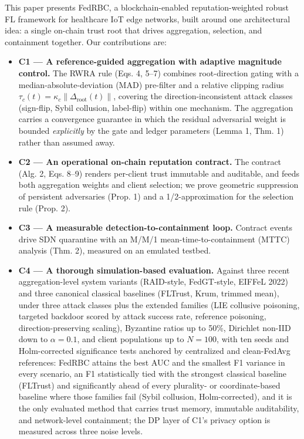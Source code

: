 \documentclass[cmc,article,submit,moreauthors,pdftex]{Definitions/tsp}
\begin{document}
This paper presents FedRBC, a blockchain-enabled reputation-weighted robust FL framework for healthcare IoT edge networks, built around one architectural idea: a single on-chain trust root that drives aggregation, selection, and containment together. Our contributions are:

\begin{itemize}
\item \textbf{C1 --- A reference-guided aggregation with adaptive magnitude control.} The RWRA rule (Eqs. 4, 5--7) combines root-direction gating with a median-absolute-deviation (MAD) pre-filter and a relative clipping radius $\tau_c(t) = \kappa_c\|\Delta_{\mathrm{root}}(t)\|$, covering the direction-inconsistent attack classes (sign-flip, Sybil collusion, label-flip) within one mechanism. The aggregation carries a convergence guarantee in which the residual adversarial weight is bounded \emph{explicitly} by the gate and ledger parameters (Lemma 1, Thm. 1) rather than assumed away.
\item \textbf{C2 --- An operational on-chain reputation contract.} The contract (Alg. 2, Eqs. 8--9) renders per-client trust immutable and auditable, and feeds both aggregation weights and client selection; we prove geometric suppression of persistent adversaries (Prop. 1) and a 1/2-approximation for the selection rule (Prop. 2).
\item \textbf{C3 --- A measurable detection-to-containment loop.} Contract events drive SDN quarantine with an M/M/1 mean-time-to-containment (MTTC) analysis (Thm. 2), measured on an emulated testbed.
\item \textbf{C4 --- A thorough simulation-based evaluation.} Against three recent aggregation-level system variants (RAID-style, FedGT-style, EIFFeL 2022) and three canonical classical baselines (FLTrust, Krum, trimmed mean), under three attack classes plus the extended families (LIE collusive poisoning, targeted backdoor scored by attack success rate, reference poisoning, direction-preserving scaling), Byzantine ratios up to 50\%, Dirichlet non-IID down to $\alpha=0.1$, and client populations up to $N{=}100$, with ten seeds and Holm-corrected significance tests anchored by centralized and clean-FedAvg references: FedRBC attains the best AUC and the smallest F1 variance in every scenario, an F1 statistically tied with the strongest classical baseline (FLTrust) and significantly ahead of every plurality- or coordinate-based baseline where those families fail (Sybil collusion, Holm-corrected), and it is the only evaluated method that carries trust memory, immutable auditability, and network-level containment; the DP layer of C1's privacy option is measured across three noise levels.
\end{itemize}
\end{document}
